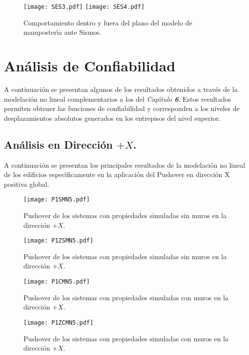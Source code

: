 \begin{figure} [htbp]
\texttt{[image: SES3.pdf]}
\texttt{[image: SES4.pdf]}
\caption{Comportamiento dentro y fuera del plano del modelo de mamposter\'{\i}a ante Sismos.}
\label{fig:apu6}
\end{figure}

\newpage

\section{An\'alisis de Confiabilidad}

A continuaci\'on se presentan algunos de los resultados obtenidos a trav\'es de la modelaci\'on no lineal complementarios a los del \emph{Cap\'{\i}tulo \textbf{6}}. Estos resultados permiten obtener las funciones de confiabilidad y corresponden a los niveles de desplazamientos absolutos generados en los entrepisos del nivel superior.

\subsection{An\'alisis en Direcci\'on $+X$.}

A continuaci\'on se presentan los principales resultados de la modelaci\'on no lineal de los edificios espec\'{\i}ficamente en la aplicaci\'on del Pushover en direcci\'on X positiva global.

\begin{figure} [htbp]
\texttt{[image: P1SMN5.pdf]}
\caption{Pushover de los sistemas con propiedades simuladas sin muros en la direcci\'on $+X$.}
\label{fig:apu7}
\end{figure}

\begin{figure} [htbp]
\texttt{[image: P1ZSMN5.pdf]}
\caption{Pushover de los sistemas con propiedades simuladas sin muros en la direcci\'on $+X$.}
\label{fig:apu8}
\end{figure}

\begin{figure} [htbp]
\texttt{[image: P1CMN5.pdf]}
\caption{Pushover de los sistemas con propiedades simuladas con muros en la direcci\'on $+X$.}
\label{fig:apu9}
\end{figure}

\begin{figure} [htbp]
\texttt{[image: P1ZCMN5.pdf]}
\caption{Pushover de los sistemas con propiedades simuladas con muros en la direcci\'on $+X$.}
\label{fig:apu10}
\end{figure}

